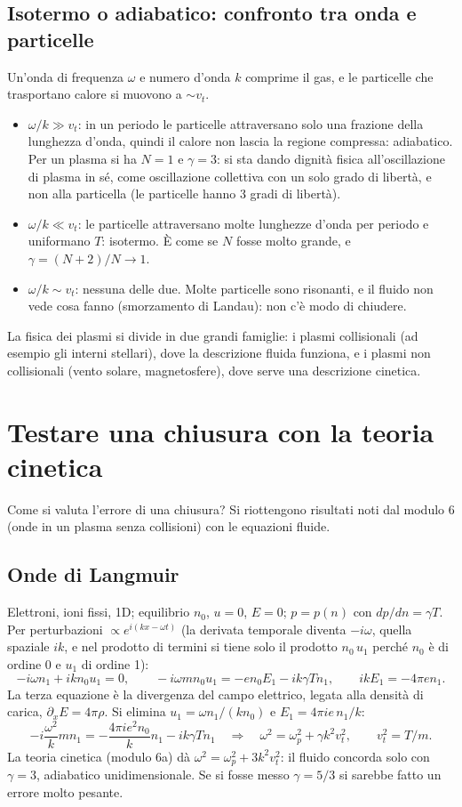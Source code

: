 \subsection{Isotermo o adiabatico: confronto tra onda e particelle}
Un'onda di frequenza $\omega$ e numero d'onda $k$ comprime il gas, e le particelle che trasportano calore si muovono a $\sim v_t$.
\begin{itemize}
\item $\omega/k\gg v_t$: in un periodo le particelle attraversano solo una frazione della lunghezza d'onda, quindi il calore non lascia la regione compressa: adiabatico. Per un plasma si ha $N=1$ e $\gamma=3$: si sta dando dignità fisica all'oscillazione di plasma in sé, come oscillazione collettiva con un solo grado di libertà, e non alla particella (le particelle hanno 3 gradi di libertà).
\item $\omega/k\ll v_t$: le particelle attraversano molte lunghezze d'onda per periodo e uniformano $T$: isotermo. È come se $N$ fosse molto grande, e $\gamma=(N+2)/N\to1$.
\item $\omega/k\sim v_t$: nessuna delle due. Molte particelle sono risonanti, e il fluido non vede cosa fanno (smorzamento di Landau): non c'è modo di chiudere.
\end{itemize}
La fisica dei plasmi si divide in due grandi famiglie: i plasmi collisionali (ad esempio gli interni stellari), dove la descrizione fluida funziona, e i plasmi non collisionali (vento solare, magnetosfere), dove serve una descrizione cinetica.

\section{Testare una chiusura con la teoria cinetica}
Come si valuta l'errore di una chiusura? Si riottengono risultati noti dal modulo 6 (onde in un plasma senza collisioni) con le equazioni fluide.

\subsection{Onde di Langmuir}
Elettroni, ioni fissi, 1D; equilibrio $n_0$, $u=0$, $E=0$; $p=p(n)$ con $dp/dn=\gamma T$. Per perturbazioni $\propto e^{i(kx-\omega t)}$ (la derivata temporale diventa $-i\omega$, quella spaziale $ik$, e nel prodotto di termini si tiene solo il prodotto $n_0\,u_1$ perché $n_0$ è di ordine 0 e $u_1$ di ordine 1):
\begin{equation}
-i\omega n_1+ikn_0u_1=0,\qquad-i\omega mn_0u_1=-en_0E_1-ik\gamma Tn_1,\qquad ikE_1=-4\pi en_1 .
\end{equation}
La terza equazione è la divergenza del campo elettrico, legata alla densità di carica, $\partial_xE=4\pi\rho$. Si elimina $u_1=\omega n_1/(kn_0)$ e $E_1=4\pi ie\,n_1/k$:
\begin{equation}
-i\frac{\omega^2}{k}mn_1=-\frac{4\pi ie^2n_0}{k}n_1-ik\gamma Tn_1\quad\Rightarrow\quad\omega^2=\omega_p^2+\gamma k^2v_t^2,\qquad v_t^2=T/m .
\end{equation}
La teoria cinetica (modulo 6a) dà $\omega^2=\omega_p^2+3k^2v_t^2$: il fluido concorda solo con $\gamma=3$, adiabatico unidimensionale. Se si fosse messo $\gamma=5/3$ si sarebbe fatto un errore molto pesante.

